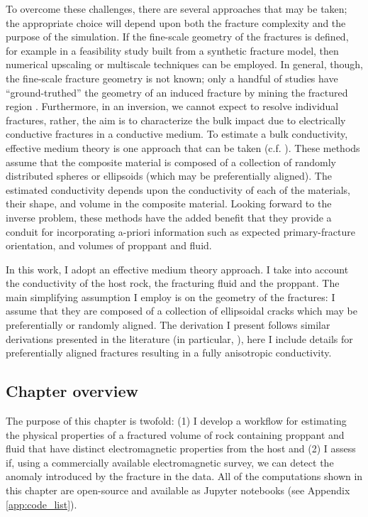 To overcome these challenges, there are several approaches that may be taken; the appropriate choice will depend upon both the fracture complexity and the purpose of the simulation. If the fine-scale geometry of the fractures is defined, for example in a feasibility study built from a synthetic fracture model, then numerical upscaling \citep{Durlofsky2003, CaudilloMata2014, CaudilloMata2016} or multiscale techniques \citep{Haber2014} can be employed. In general, though, the fine-scale fracture geometry is not known; only a handful of studies have ``ground-truthed'' the geometry of an induced fracture by mining the fractured region \citep{Cipolla2008a}. Furthermore, in an inversion, we cannot expect to resolve individual fractures, rather, the aim is to characterize the bulk impact due to electrically conductive fractures in a conductive medium. To estimate a bulk conductivity, effective medium theory is one approach that can be taken (c.f. \cite{Torquato2002, Milton2002, Berryman2013}). These methods assume that the composite material is composed of a collection of randomly distributed spheres or ellipsoids (which may be preferentially aligned). The estimated conductivity depends upon the conductivity of each of the materials, their shape, and volume in the composite material. Looking forward to the inverse problem, these methods have the added benefit that they provide a conduit for incorporating a-priori information such as expected primary-fracture orientation, and volumes of proppant and fluid.

In this work, I adopt an effective medium theory approach. I take into account the conductivity of the host rock, the fracturing fluid and the proppant. The main simplifying assumption I employ is on the geometry of the fractures: I assume that they are composed of a collection of ellipsoidal cracks which may be preferentially or randomly aligned. The derivation I present follows similar derivations presented in the literature (in particular, \cite{Torquato2002}), here I include details for preferentially aligned fractures resulting in a fully anisotropic conductivity.
\subsection{Chapter overview}
The purpose of this chapter is twofold: (1) I develop a workflow for estimating the physical properties of a fractured volume of rock containing proppant and fluid that have distinct electromagnetic properties from the host and (2) I assess if, using a commercially available electromagnetic survey, we can detect the anomaly introduced by the fracture in the data. All of the computations shown in this chapter are open-source and available as Jupyter notebooks (see Appendix \ref{app:code_list}).

